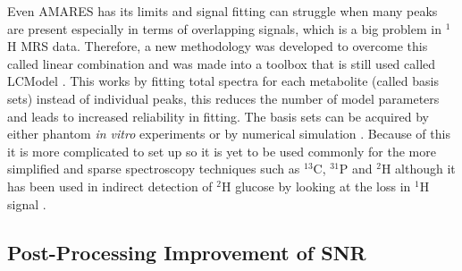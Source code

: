 \documentclass[class=article, crop=false]{standalone}
\begin{document}
Even AMARES has its limits and signal fitting can struggle when many peaks are present especially in terms of overlapping signals, which is a big problem in $^1$H MRS data. Therefore, a new methodology was developed to overcome this called linear combination and was made into a toolbox that is still used called LCModel \cite{Provencher1993EstimationSpectra}. This works by fitting total spectra for each metabolite (called basis sets) instead of individual peaks, this reduces the number of model parameters and leads to increased reliability in fitting. The basis sets can be acquired by either phantom \textit{in vitro} experiments or by numerical simulation \cite{Near2021PreprocessingRecommendations}. Because of this it is more complicated to set up so it is yet to be used commonly for the more simplified and sparse spectroscopy techniques such as $^{13}$C, $^{31}$P and $^2$H although it has been used in indirect detection of $^2$H glucose by looking at the loss in $^1$H signal \cite{Rich20201HVivo,Cember2022IntegratingHumans,Niess2023Reproducibility3T}. 

\subsection{Post-Processing Improvement of SNR}
\end{document}
